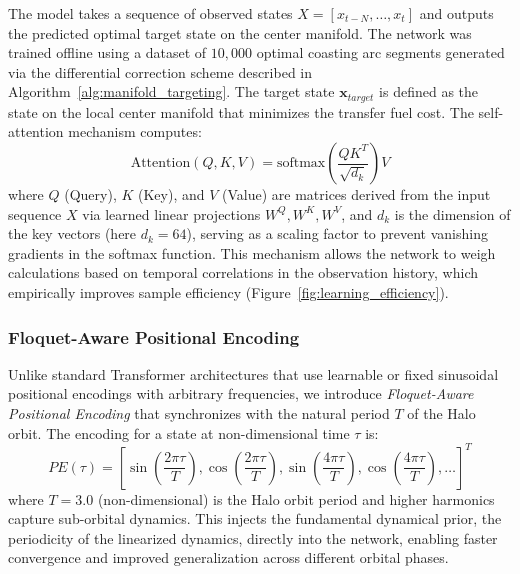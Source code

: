 \documentclass[10pt,letterpaper]{article}
\begin{document}
The model takes a sequence of observed states $X = [x_{t-N}, \dots, x_t]$ and outputs the predicted optimal target state on the center manifold. The network was trained offline using a dataset of $10,000$ optimal coasting arc segments generated via the differential correction scheme described in Algorithm~\ref{alg:manifold_targeting}. The target state $\mathbf{x}_{target}$ is defined as the state on the local center manifold that minimizes the transfer fuel cost. The self-attention mechanism computes:
\begin{equation}
    \text{Attention}(Q, K, V) = \text{softmax}\left(\frac{QK^T}{\sqrt{d_k}}\right)V
\end{equation}
where $Q$ (Query), $K$ (Key), and $V$ (Value) are matrices derived from the input sequence $X$ via learned linear projections $W^Q, W^K, W^V$, and $d_k$ is the dimension of the key vectors (here $d_k=64$), serving as a scaling factor to prevent vanishing gradients in the softmax function. This mechanism allows the network to weigh calculations based on temporal correlations in the observation history, which empirically improves sample efficiency (Figure~\ref{fig:learning_efficiency}).

\subsubsection{Floquet-Aware Positional Encoding}
Unlike standard Transformer architectures that use learnable or fixed sinusoidal positional encodings with arbitrary frequencies, we introduce \textit{Floquet-Aware Positional Encoding} that synchronizes with the natural period $T$ of the Halo orbit. The encoding for a state at non-dimensional time $\tau$ is:
\begin{equation}
    PE(\tau) = \left[ \sin\left(\frac{2\pi \tau}{T}\right), \cos\left(\frac{2\pi \tau}{T}\right), \sin\left(\frac{4\pi \tau}{T}\right), \cos\left(\frac{4\pi \tau}{T}\right), \dots \right]^T \label{eq:pe}
\end{equation}
where $T = 3.0$ (non-dimensional) is the Halo orbit period and higher harmonics capture sub-orbital dynamics. This injects the fundamental dynamical prior, the periodicity of the linearized dynamics, directly into the network, enabling faster convergence and improved generalization across different orbital phases.
\end{document}
